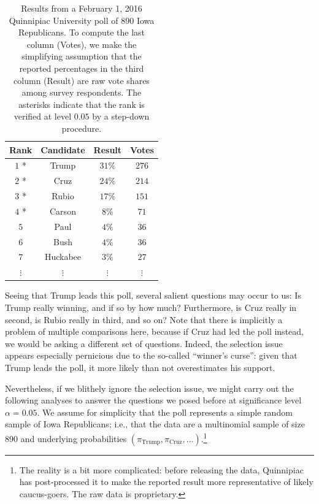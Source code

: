 \documentclass[11pt]{article}
\theoremstyle{definition}
\theoremstyle{custom}
\begin{document}
\begin{table}[htbp]
\begin{center}
\begin{tabular}{c c c c}
	\hline
	Rank & Candidate & Result & Votes \\
	\hline
	$1$ * & Trump & $31\%$ & $276$ \\
	$2$ * & Cruz & $24\%$ & $214$ \\
	$3$ * & Rubio & $17\%$ & $151$ \\
	$4$ * & Carson & $8\%$ & $71$ \\
	$5$ & Paul & $4\%$ & $36$ \\
	$6$ & Bush & $4\%$ & $36$ \\
	$7$ & Huckabee & $3\%$ & $27$ \\
	$\vdots$ & $\vdots$ & $\vdots $ & $\vdots$ \\
	\hline
\end{tabular}
\end{center}
\caption{Results from a February 1, 2016 Quinnipiac University poll of $890$ Iowa Republicans. To compute the last column (Votes), we make the simplifying assumption that the reported percentages in the third column (Result) are raw vote shares among survey respondents. The asterisks indicate that the rank is verified at level $0.05$ by a step-down procedure.}
\label{tbl:poll}
\end{table}

Seeing that Trump leads this poll, several salient questions may occur to us: Is Trump really winning, and if so by how much? Furthermore, is Cruz really in second, is Rubio really in third, and so on? Note that there is implicitly a problem of multiple comparisons here, because if Cruz had led the poll instead, we would be asking a different set of questions. Indeed, the selection issue appears especially pernicious due to the so-called ``winner's curse'': given that Trump leads the poll, it more likely than not overestimates his support.

Nevertheless, if we blithely ignore the selection issue, we might carry out the following analyses to answer the questions we posed before at significance level $\alpha = 0.05$. We assume for simplicity that the poll represents a simple random sample of Iowa Republicans; i.e., that the data are a multinomial sample of size $890$ and underlying probabilities $\left(\pi_{\text{Trump}}, \pi_{\text{Cruz}}, \ldots\right)$.\footnote{The reality is a bit more complicated: before releasing the data, Quinnipiac has post-processed it to make the reported result more representative of likely caucus-goers. The raw data is proprietary.}
\end{document}
